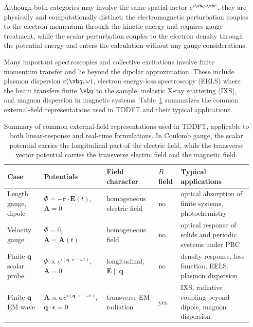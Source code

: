 Although both categories may involve the same spatial
factor $e^{\imath\vb q\cdot\vb r}$, they are physically
and computationally distinct: the electromagnetic
perturbation couples to the electron momentum through
the kinetic energy and requires gauge treatment, while
the scalar perturbation couples to the electron density
through the potential energy and enters the calculation
without any gauge considerations.


Many important spectroscopies and collective excitations
involve finite momentum transfer and lie beyond the
dipolar approximation.
These include plasmon dispersion
$\varepsilon(\vb q,\omega)$, electron energy-loss
spectroscopy (EELS) where the beam transfers finite
$\vb q$ to the sample, inelastic X-ray scattering (IXS),
and magnon dispersion in magnetic systems.
Table~\ref{tab:gauge_cases} summarizes the common
external-field representations used in TDDFT and
their typical applications.

\begin{table}[t]
\footnotesize
\caption{Summary of common external-field representations
  used in TDDFT, applicable to both linear-response and
  real-time formulations.
  In Coulomb gauge, the scalar potential carries the
  longitudinal part of the electric field, while the
  transverse vector potential carries the transverse
 electric field and the magnetic field.}
\label{tab:gauge_cases}
\centering
\begin{tabular}{p{2.5cm}p{4.2cm}p{3.2cm}p{1.4cm}p{4.0cm}}
\hline
Case
  & Potentials
  & Field character
  & $B$ field
  & Typical applications \\
\hline
Length gauge, dipole
  & $\Phi=-\mathbf r\cdot\mathbf E(t)$,
    $\mathbf A=0$
  & homogeneous electric field
  & no
  & optical absorption of finite
    systems,
    photochemistry
    \cite{Yabana1996,Jakowski2025} \\[0.6em]
Velocity gauge
  & $\Phi=0$,
    $\mathbf A=\mathbf A(t)$
  & homogeneous field
  & no
  & optical response of solids and
    periodic systems under PBC
    \cite{Bertsch2000,Mattiat2022,Hanasaki2023}
    \\[0.6em]
Finite-$\mathbf q$ scalar probe
  & $\Phi \propto e^{i(\mathbf q\cdot\mathbf r
    -\omega t)}$, $\mathbf A=0$
  & longitudinal,
    $\mathbf E \parallel \mathbf q$
  & no
  & density response, loss function,
    EELS, plasmon
    dispersion
    \cite{Onida2002,Weissker2006,Weissker2010}
    \\[0.6em]
Finite-$\mathbf q$ EM wave
  & $\mathbf A \propto
    \boldsymbol{\epsilon}\,
    e^{i(\mathbf q\cdot\mathbf r-\omega t)}$,
    $\mathbf q\cdot\boldsymbol{\epsilon}=0$
  & transverse EM radiation
  & yes
  & IXS, radiative coupling
    beyond dipole,
    magnon dispersion
    \cite{TancogneDejean2020,Krieger2015}
    \\
\hline
\end{tabular}
\end{table}

